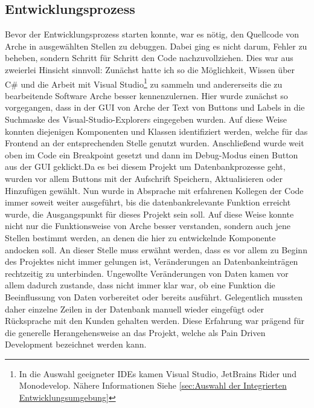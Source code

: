 \documentclass[11pt,toc=sectionentrywithoutdots, 
headheight=44pt, headings=optiontoheadandtoc, hyperfootnotes=false, hypertexnames=false]{scrartcl}
\newcommand\extendedref[1]{Siehe \ref{#1}}
\begin{document}
\subsection{Entwicklungsprozess}
Bevor der Entwicklungsprozess starten konnte, war es nötig, den Quellcode von Arche in ausgewählten Stellen zu debuggen. Dabei ging es nicht darum, Fehler zu beheben, sondern Schritt für Schritt den Code nachzuvollziehen. Dies war aus zweierlei Hinsicht sinnvoll: Zunächst hatte ich so die Möglichkeit, Wissen über C\# und die Arbeit mit Visual Studio\footnote{In die Auswahl geeigneter \acs{IDE}s kamen Visual Studio, JetBrains Rider und Monodevelop. Nähere Informationen \extendedref{sec:Auswahl der Integrierten Entwicklungsumgebung}} zu sammeln und andererseits die zu bearbeitende Software Arche besser kennenzulernen. Hier wurde zunächst so vorgegangen, dass in der GUI von Arche der Text von Buttons und Labels in die Suchmaske des Visual-Studio-Explorers eingegeben wurden. Auf diese Weise konnten diejenigen Komponenten und Klassen identifiziert werden, welche für das Frontend an der entsprechenden Stelle genutzt wurden. Anschließend wurde weit oben im Code ein \gls{Breakpoint} gesetzt und dann im Debug-Modus einen Button aus der GUI geklickt.\newline\newline Da es bei diesem Projekt um Datenbankprozesse geht, wurden vor allem Buttons mit der Aufschrift \glqq Speichern\grqq{}, \glqq Aktualisieren\grqq{} oder \glqq Hinzufügen\grqq{} gewählt. Nun wurde in Absprache mit erfahrenen Kollegen der Code immer soweit weiter ausgeführt, bis die datenbankrelevante Funktion erreicht wurde, die Ausgangspunkt für dieses Projekt sein soll. Auf diese Weise konnte nicht nur die Funktionsweise von Arche besser verstanden, sondern auch jene Stellen bestimmt werden, an denen die hier zu entwickelnde Komponente andocken soll. An dieser Stelle muss erwähnt werden, dass es vor allem zu Beginn des Projektes nicht immer gelungen ist, Veränderungen an Datenbankeinträgen rechtzeitig zu unterbinden. Ungewollte Veränderungen von Daten kamen vor allem dadurch zustande, dass nicht immer klar war, ob eine Funktion die Beeinflussung von Daten vorbereitet oder bereits ausführt. Gelegentlich mussten daher einzelne Zeilen in der Datenbank manuell wieder eingefügt oder Rücksprache mit den Kunden gehalten werden. Diese Erfahrung war prägend für die generelle Herangehensweise an das Projekt, welche als \gls{Pain Driven Development} bezeichnet werden kann.
\end{document}
